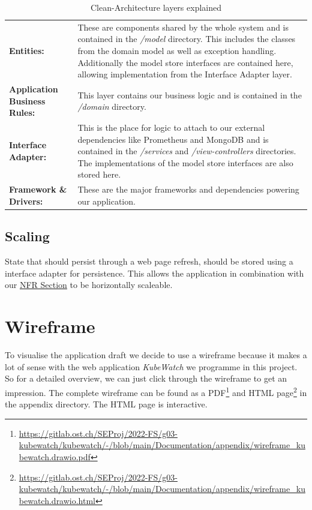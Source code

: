 \begin{table}[H]
  \begin{tabular*}{\textwidth}{p{3cm} | p{11cm}}
    \textbf{Entities:}
      & These are components shared by the whole system and is contained in the \textit{/model} directory. This includes the classes from the domain model as well as exception handling. Additionally the model store interfaces are contained here, allowing implementation from the Interface Adapter layer. \bigskip \\
    \textbf{Application Business Rules:}
      & This layer contains our business logic and is contained in the \textit{/domain} directory. \bigskip \\
    \textbf{Interface Adapter:}
      & This is the place for logic to attach to our external dependencies like Prometheus and MongoDB and is contained in the \textit{/services} and \textit{/view-controllers} directories. The implementations of the model store interfaces are also stored here. \bigskip \\
    \textbf{Framework \& Drivers:}
      & These are the major frameworks and dependencies powering our application. \\
  \end{tabular*}
  \caption{Clean-Architecture layers explained}
  \label{tab:clean-architecture-layers-explained}
\end{table}

\subsection{Scaling}

State that should persist through a web page refresh, should be stored using a interface adapter for persistence. This allows the application in combination with our \hyperref[section:non-functional-requirements]{NFR Section} to be horizontally scaleable.

\section{Wireframe}

To visualise the application draft we decide to use a wireframe because it makes a lot of sense with the web application \textit{KubeWatch} we programme in this project. So for a detailed overview, we can just click through the wireframe to get an impression. The complete wireframe can be found as a PDF\footnote{\url{https://gitlab.ost.ch/SEProj/2022-FS/g03-kubewatch/kubewatch/-/blob/main/Documentation/appendix/wireframe_kubewatch.drawio.pdf}} and HTML page\footnote{\url{https://gitlab.ost.ch/SEProj/2022-FS/g03-kubewatch/kubewatch/-/blob/main/Documentation/appendix/wireframe_kubewatch.drawio.html}} in the appendix directory.
The HTML page is interactive.
